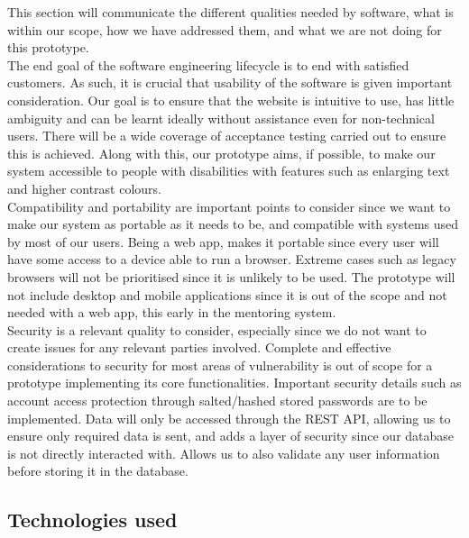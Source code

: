 \documentclass[10pt]{article}
\begin{document}
This section will communicate the different qualities needed by software, what
is within our scope, how we have addressed them, and what we are not doing for
this prototype.\\ The end goal of the software engineering lifecycle is to end
with satisfied customers. As such, it is crucial that usability of the software
is given important consideration. Our goal is to ensure that the website is
intuitive to use, has little ambiguity and can be learnt ideally without
assistance even for non-technical users. There will be a wide coverage of
acceptance testing carried out to ensure this is achieved. Along with this, our
prototype aims, if possible, to make our system accessible to people with
disabilities with features such as enlarging text and higher contrast colours.
\\Compatibility and portability are important points to consider since we want to
make our system as portable as it needs to be, and compatible with systems used
by most of our users. Being a web app, makes it portable since every user will
have some access to a device able to run a browser. Extreme cases such as legacy
browsers will not be prioritised since it is unlikely to be used. The prototype
will not include desktop and mobile applications since it is out of the scope
and not needed with a web app, this early in the mentoring system. \\Security is a
relevant quality to consider, especially since we do not want to create issues
for any relevant parties involved. Complete and effective considerations to
security for most areas of vulnerability is out of scope for a prototype
implementing its core functionalities. Important security details such as
account access protection through salted/hashed stored passwords are to be
implemented. Data will only be accessed through the REST API, allowing us to
ensure only required data is sent, and adds a layer of security since our
database is not directly interacted with. Allows us to also validate any user
information before storing it in the database.

\subsection{Technologies used}
\end{document}
